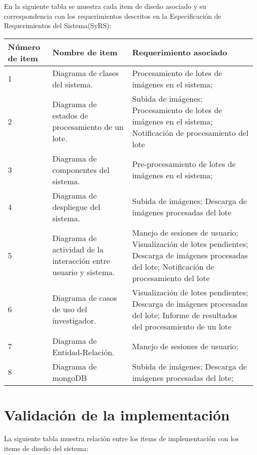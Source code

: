 \documentclass{scrreprt}
\begin{document}
En la siguiente tabla se muestra cada item de diseño asociado y su correspondencia con los requerimientos descritos en la Especificación de Requerimientos del Sistema(SyRS):

\begin{center}
    \begin{tabular}{|p{1.5cm}|p{5.0cm}|p{7.5cm}|}
        \hline
	    Número de item & Nombre de item & Requerimiento asociado \\
        \hline
	    1 & Diagrama de clases del sistema.  & Procesamiento de lotes de imágenes en el sistema;  \\
        \hline        
        2 & Diagrama de estados de procesamiento de un lote.  &  Subida de imágenes; Procesamiento de lotes de imágenes en el sistema; Notificación de procesamiento del lote  \\
        \hline
        3 & Diagrama de componentes del sistema. &  Pre-procesamiento de lotes de imágenes en el sistema; \\
        \hline
        4 & Diagrama de despliegue del sistema. & Subida de imágenes; Descarga de imágenes procesadas del lote\\
        \hline
        5 & Diagrama de actividad de la interacción entre usuario y sistema. & Manejo de sesiones de usuario;  Visualización de lotes pendientes;  Descarga de imágenes procesadas del lote; Notificación de procesamiento del lote\\
        \hline
        6 & Diagrama de casos de uso del investigador. &  Visualización de lotes pendientes;  Descarga de imágenes procesadas del lote; Informe de resultados del procesamiento de un lote \\
        \hline
        7 & Diagrama de Entidad-Relación. & Manejo de sesiones de usuario; \\
        \hline
        8 & Diagrama de mongoDB & Subida de imágenes;  Descarga de imágenes procesadas del lote;\\
        \hline
        
    \end{tabular}
\end{center}

\section{Validación de la implementación}

La siguiente tabla muestra relación entre los items de implementación con los items de diseño del sistema:
\end{document}
